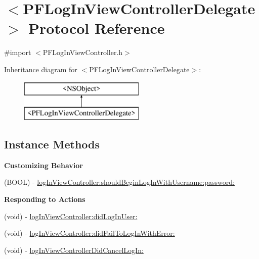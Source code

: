 \hypertarget{protocol_p_f_log_in_view_controller_delegate-p}{}\section{$<$P\+F\+Log\+In\+View\+Controller\+Delegate$>$ Protocol Reference}
\label{protocol_p_f_log_in_view_controller_delegate-p}


{\ttfamily \#import $<$P\+F\+Log\+In\+View\+Controller.\+h$>$}

Inheritance diagram for $<$P\+F\+Log\+In\+View\+Controller\+Delegate$>$\+:\begin{figure}[H]
\begin{center}
\leavevmode
\includegraphics[height=2.000000cm]{protocol_p_f_log_in_view_controller_delegate-p}
\end{center}
\end{figure}
\subsection*{Instance Methods}
\begin{Indent}{\bf Customizing Behavior}\par
{\em 

 

 }\begin{DoxyCompactItemize}
\item 
(B\+O\+O\+L) -\/ \hyperlink{protocol_p_f_log_in_view_controller_delegate-p_a60cfb2662f46527be38db7fb01227d03}{log\+In\+View\+Controller\+:should\+Begin\+Log\+In\+With\+Username\+:password\+:}
\end{DoxyCompactItemize}
\end{Indent}
\begin{Indent}{\bf Responding to Actions}\par
{\em 

 

 }\begin{DoxyCompactItemize}
\item 
(void) -\/ \hyperlink{protocol_p_f_log_in_view_controller_delegate-p_aa9813f265c5c79668c0e175f259f72e0}{log\+In\+View\+Controller\+:did\+Log\+In\+User\+:}
\item 
(void) -\/ \hyperlink{protocol_p_f_log_in_view_controller_delegate-p_afe0b15f1288c4c19716a2ca05d818c71}{log\+In\+View\+Controller\+:did\+Fail\+To\+Log\+In\+With\+Error\+:}
\item 
(void) -\/ \hyperlink{protocol_p_f_log_in_view_controller_delegate-p_a5d25a707aa54c6497a39298095690974}{log\+In\+View\+Controller\+Did\+Cancel\+Log\+In\+:}
\end{DoxyCompactItemize}
\end{Indent}


